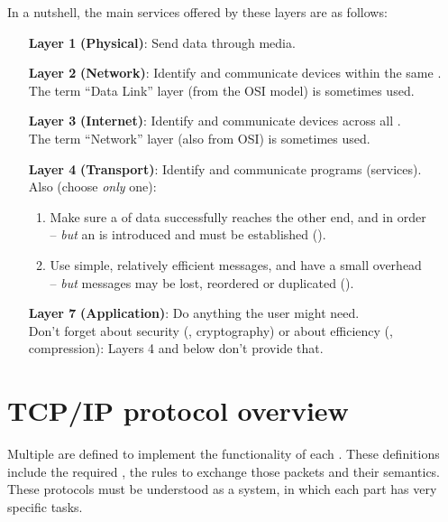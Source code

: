 In a nutshell, the main services offered by these layers are as follows:
\begin{enumerate}
\item[\textbf{Layer 1}] \textbf{(Physical)}: 
  Send  data through  media.
\item[\textbf{Layer 2}] \textbf{(Network)}:
  Identify and communicate devices within the same .\\
  The term ``Data Link'' layer (from the OSI model) is sometimes used.
\item[\textbf{Layer 3}] \textbf{(Internet)}:
  Identify and communicate devices across all .\\
  The term ``Network'' layer (also from OSI) is sometimes used.
\item[\textbf{Layer 4}] \textbf{(Transport)}:
  Identify and communicate programs (services).\\
  Also (choose \textit{only} one):
  \begin{enumerate}[label=\alph*)]
   \item Make sure a  of data successfully reaches the other end, 
   and in order \\-- \textit{but} an  is introduced 
   and  must be established ().
     
   \item Use simple, relatively efficient messages, and have a small overhead\\
   -- \textit{but} messages may be lost, reordered or duplicated ().
  \end{enumerate}
\item[\textbf{Layer 7}] \textbf{(Application)}:
  Do anything the user might need. \\
  Don't forget about security (\eg, cryptography) 
  or about efficiency (\eg, compression): Layers 4 and below don't provide that.
\end{enumerate}

\section{TCP/IP protocol overview}

Multiple  are defined to implement the functionality
of each . These definitions include the required ,
the rules to exchange those packets and their semantics.
% 
These protocols must be understood as a system, in which each part has very specific tasks.

